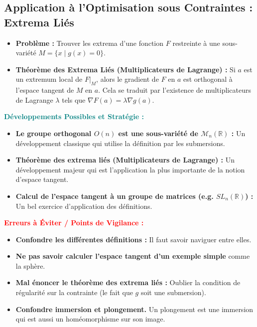\documentclass[12pt, a4paper, parskip=full]{report}
\theoremstyle{agregstyle}
\newenvironment{developpements}
  {\par\medskip\noindent\begin{oframed}\noindent\textbf{\textcolor{teal}{Développements Possibles et Stratégie :}}}
  {\end{oframed}\par\medskip}
\newenvironment{erreurs}
  {\par\medskip\noindent\begin{oframed}\noindent\textbf{\textcolor{red}{Erreurs à Éviter / Points de Vigilance :}}}
  {\end{oframed}\par\medskip}
\begin{document}
\subsection{Application à l'Optimisation sous Contraintes : Extrema Liés}
\begin{itemize}
    \item \textbf{Problème :} Trouver les extrema d'une fonction $F$ restreinte à une sous-variété $M = \{x \mid g(x)=0\}$.
    \item \textbf{Théorème des Extrema Liés (Multiplicateurs de Lagrange) :} Si $a$ est un extremum local de $F|_M$, alors le gradient de $F$ en $a$ est orthogonal à l'espace tangent de $M$ en $a$. Cela se traduit par l'existence de multiplicateurs de Lagrange $\lambda$ tels que $\nabla F(a) = \lambda \nabla g(a)$.
\end{itemize}

\begin{developpements}
    \begin{itemize}
        \item \textbf{Le groupe orthogonal $O(n)$ est une sous-variété de $\mathcal{M}_n(\mathbb{R})$ :} Un développement classique qui utilise la définition par les submersions.
        \item \textbf{Théorème des extrema liés (Multiplicateurs de Lagrange) :} Un développement majeur qui est l'application la plus importante de la notion d'espace tangent.
        \item \textbf{Calcul de l'espace tangent à un groupe de matrices (e.g. $SL_n(\mathbb{R})$) :} Un bel exercice d'application des définitions.
    \end{itemize}
\end{developpements}

\begin{erreurs}
    \begin{itemize}
        \item \textbf{Confondre les différentes définitions :} Il faut savoir naviguer entre elles.
        \item \textbf{Ne pas savoir calculer l'espace tangent d'un exemple simple} comme la sphère.
        \item \textbf{Mal énoncer le théorème des extrema liés :} Oublier la condition de régularité sur la contrainte (le fait que $g$ soit une submersion).
        \item \textbf{Confondre immersion et plongement.} Un plongement est une immersion qui est aussi un homéomorphisme sur son image.
    \end{itemize}
\end{erreurs}
\end{document}
